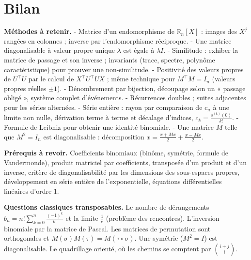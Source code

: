 \documentclass[11pt,a4paper]{article}
\begin{document}
\hypertarget{bilan}{%
\section{Bilan}\label{bilan}}

\textbf{Méthodes à retenir.}
- Matrice d'un endomorphisme de \(\mathbb R_n[X]\) : images des \(X^j\) rangées en colonnes ; inverse par l'endomorphisme réciproque.
- Une matrice diagonalisable à valeur propre unique \(\lambda\) est égale à \(\lambda I\).
- Similitude : exhiber la matrice de passage et son inverse ; invariants (trace, spectre, polynôme caractéristique) pour prouver une non-similitude.
- Positivité des valeurs propres de \(U^\top U\) par le calcul de \(X^\top U^\top UX\) ; même technique pour \(M^\top M=I_n\) (valeurs propres réelles \(\pm1\)).
- Dénombrement par bijection, découpage selon un « passage obligé », système complet d'événements.
- Récurrences doubles ; suites adjacentes pour les séries alternées.
- Série entière : rayon par comparaison de \(c_n\) à une limite non nulle, dérivation terme à terme et décalage d'indices, \(c_k=\frac{s^{(k)}(0)}{k!}\).
- Formule de Leibniz pour obtenir une identité binomiale.
- Une matrice \(M\) telle que \(M^2=I_n\) est diagonalisable : décomposition \(x=\frac{x+Mx}2+\frac{x-Mx}2\).

\textbf{Prérequis à revoir.} Coefficients binomiaux (binôme, symétrie, formule de Vandermonde), produit matriciel par coefficients, transposée d'un produit et d'un inverse, critère de diagonalisabilité par les dimensions des sous-espaces propres, développement en série entière de l'exponentielle, équations différentielles linéaires d'ordre 1.

\textbf{Questions classiques transposables.} Le nombre de dérangements \(b_n=n!\sum_{k=0}^n\frac{(-1)^k}{k!}\) et la limite \(\frac1e\) (problème des rencontres). L'inversion binomiale par la matrice de Pascal. Les matrices de permutation sont orthogonales et \(M(\sigma)M(\tau)=M(\tau\circ\sigma)\). Une symétrie (\(M^2=I\)) est diagonalisable. Le quadrillage orienté, où les chemins se comptent par \(\binom{i+j}i\).
\end{document}
